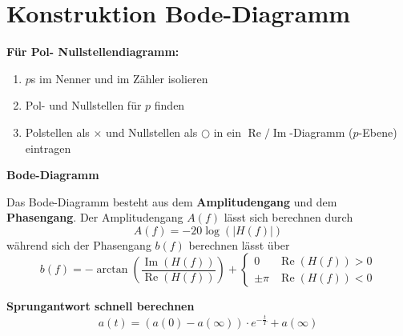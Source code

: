 \documentclass[12pt, a4paper, twoside]{scrartcl}
\begin{document}
\clearpage
\section{Konstruktion Bode-Diagramm}

\textbf{Für Pol- Nullstellendiagramm:}

\begin{enumerate}
\item \(p\)s im Nenner und im Zähler isolieren
\item Pol- und Nullstellen für \(p\) finden
\item Polstellen als \(\times\) und Nullstellen als \(\bigcirc\) in ein \(\operatorname{Re} / \operatorname{Im}\)-Diagramm (\(p\)-Ebene) eintragen
\end{enumerate}

\textbf{Bode-Diagramm}

Das Bode-Diagramm besteht aus dem \textbf{Amplitudengang} und dem \textbf{Phasengang}. Der Amplitudengang \(A(f)\) lässt sich berechnen durch
\[A(f) = -20\log(|H(f)|)\]
während sich der Phasengang \(b(f)\) berechnen lässt über
\[b(f) = -\arctan\left(\frac{\operatorname{Im}(H(f))}{\operatorname{Re}(H(f))}\right) +
  \begin{cases}
    0 & \operatorname{Re}(H(f)) > 0\\
    \pm \pi & \operatorname{Re}(H(f)) < 0
  \end{cases}
\]

\textbf{Sprungantwort schnell berechnen}
\[a(t) = (a(0) - a(\infty)) \cdot e^{-\frac{t}{T}} + a(\infty)\]

\newpage
{}%
\addtocounter{section}{1}

\newpage
{}%
\addtocounter{subsection}{1}


\newpage
{}%
\addtocounter{subsection}{1}

\end{document}

